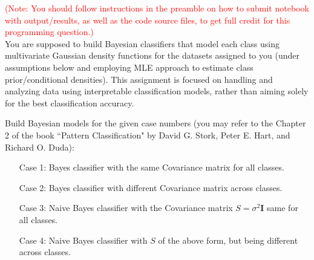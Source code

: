 \documentclass[solution,addpoints,12pt]{exam}
\newcommand{\red}[1]{\textcolor{red}{#1}}
\begin{document}
\begin{questions}


\red{(Note: You should follow instructions in the preamble on how to submit notebook with output/results, as well as the code source files, to get full credit for this programming question.)}\\
You are supposed to build Bayesian classifiers that model each class using multivariate Gaussian density functions for the datasets assigned to you (under assumptions below and employing MLE approach to estimate class prior/conditional densities). This assignment is focused on handling and analyzing data using interpretable classification models, rather than aiming solely for the best classification accuracy. 
    
Build Bayesian models for the given case numbers (you may refer to the Chapter 2 of the book ``Pattern Classification" by David G. Stork, Peter E. Hart, and Richard O. Duda):
\begin{enumerate}
    \item[Case 1:] Bayes classifier with the same Covariance matrix for all classes.
    \item[Case 2:] Bayes classifier with different Covariance matrix across classes.
    \item[Case 3:] Naive Bayes classifier with the Covariance matrix $S = \sigma^2 \mathbf{I}$ same for all classes.
    \item[Case 4:] Naive Bayes classifier with $S$ of the above form, but being different across classes.
\end{enumerate}
    

\end{questions}
\end{document}
